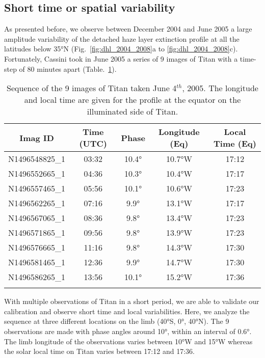 \subsection{Short time or spatial  variability}

As presented before, we observe between December 2004 and June 2005 a large amplitude variability of the
detached haze layer extinction profile at all the latitudes below \ang{35}N (Fig.~\ref{fig:dhl_2004_2008}a
to \ref{fig:dhl_2004_2008}c). Fortunately, Cassini took in June 2005 a series of 9 images of
Titan with a time-step of 80 minutes apart (Table.~\ref{tab:time_variability}).

\begin{table}[!ht]
    \centering
    \caption{Sequence of the 9 images of Titan taken June 4$^{th}$, 2005.
    The longitude and local time are given for the profile at the equator
    on the illuminated side of Titan.}
    \vspace{.5cm}
    \begin{tabular} {c c c c c}
        \toprule
        Imag ID & Time (UTC) & Phase & Longitude (Eq) & Local Time (Eq)\\
        \midrule
        N1496548825\_1 & 03:32 & \ang{10.4} & \ang{10.7}W & 17:12 \\
        N1496552665\_1 & 04:36 & \ang{10.3} & \ang{10.4}W & 17:17 \\
        N1496557465\_1 & 05:56 & \ang{10.1} & \ang{10.6}W & 17:23 \\
        N1496562265\_1 & 07:16 &  \ang{9.9} & \ang{13.1}W & 17:17 \\
        N1496567065\_1 & 08:36 &  \ang{9.8} & \ang{13.4}W & 17:23 \\
        N1496571865\_1 & 09:56 &  \ang{9.8} & \ang{13.9}W & 17:23 \\
        N1496576665\_1 & 11:16 &  \ang{9.8} & \ang{14.3}W & 17:30 \\
        N1496581465\_1 & 12:36 &  \ang{9.9} & \ang{14.7}W & 17:30 \\
        N1496586265\_1 & 13:56 & \ang{10.1} & \ang{15.2}W & 17:36 \\
        \bottomrule
        \label{tab:time_variability}
    \end{tabular}
\end{table}

With multiple observations of Titan in a short period, we are able to validate our calibration and
observe short time and local variabilities. Here, we analyze the sequence at three different
locations on the limb (\ang{40}S, \ang{0}, \ang{40}N). The 9 observations are made with phase
angles around \ang{10}, within an interval of \ang{0.6}. The limb longitude of the observations
varies  between \ang{10}W and \ang{15}W whereas the solar local time on Titan varies between
17:12 and 17:36.

